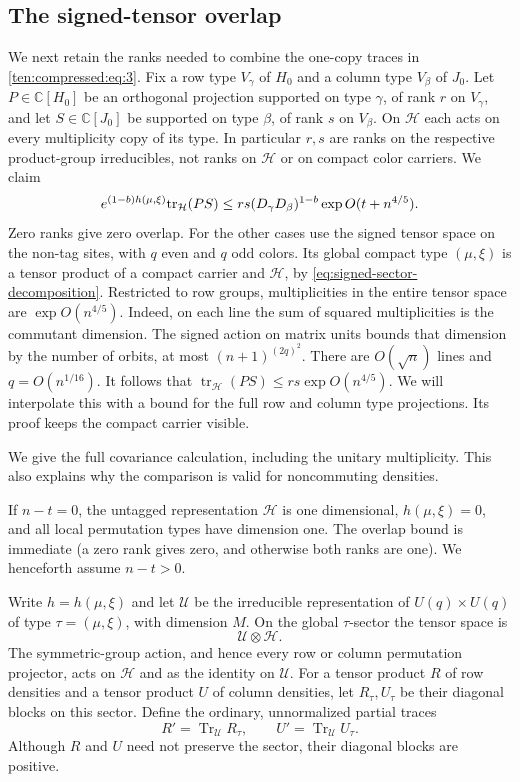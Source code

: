 \subsection{The signed-tensor overlap}
We next retain the ranks needed to combine the one-copy traces in
\eqref{ten:compressed:eq:3}. Fix a row type $V_\gamma$ of $H_0$
and a column type $V_\beta$ of $J_0$. Let $P\in\mathbb C[H_0]$
be an orthogonal projection supported on type $\gamma$, of rank
$r$ on $V_\gamma$, and let $S\in\mathbb C[J_0]$ be supported on
type $\beta$, of rank $s$ on $V_\beta$. On $\mathcal H$ each acts
on every multiplicity copy of its type. In particular $r,s$ are
ranks on the respective product-group irreducibles, not ranks on
$\mathcal H$ or on compact color carriers. We claim
\begin{equation}
 e^{(1-b)h(\mu,\xi)}{\rm tr}_{\mathcal H}(PS)
 \le r s (D_\gamma D_\beta)^{1-b}\exp O(t+n^{4/5}).
 \label{ten:compressed:eq:5}
\end{equation}
Zero ranks give zero overlap. For the other cases use the signed
tensor space on the non-tag sites, with $q$ even and $q$ odd colors.
Its global compact type $(\mu,\xi)$ is a tensor product of a
compact carrier and $\mathcal H$, by
\eqref{eq:signed-sector-decomposition}.
Restricted to row groups, multiplicities in the entire tensor
space are $\exp O(n^{4/5})$. Indeed, on each line the sum of
squared multiplicities is the commutant dimension. The signed
action on matrix units bounds that dimension by the number of
orbits, at most $(n+1)^{(2q)^2}$. There are $O(\sqrt n)$ lines
and $q=O(n^{1/16})$.
It follows that
$\operatorname{tr}_{\mathcal H}(PS)\le rs\exp O(n^{4/5})$.
We will interpolate this with a bound for the full row and column
type projections. Its proof keeps the compact carrier visible.

\label{ten:compressed:covariance-expansion}
We give the full covariance calculation, including the unitary multiplicity. This also explains why the comparison is valid for noncommuting densities.

If $n-t=0$, the untagged representation $\mathcal H$ is one dimensional, $h(\mu,\xi)=0$, and all local permutation types have dimension one. The overlap bound is immediate (a zero rank gives zero, and otherwise both ranks are one). We henceforth assume $n-t>0$.

Write $h=h(\mu,\xi)$ and let $\mathcal U$ be the irreducible representation of $U(q)\times U(q)$ of type $\tau=(\mu,\xi)$, with dimension $M$. On the global $\tau$-sector the tensor space is
\[
 \mathcal U\otimes\mathcal H.
\]
The symmetric-group action, and hence every row or column permutation projector, acts on $\mathcal H$ and as the identity on $\mathcal U$. For a tensor product $R$ of row densities and a tensor product $U$ of column densities, let $R_\tau,U_\tau$ be their diagonal blocks on this sector. Define the ordinary, unnormalized partial traces
\[
 R'=\operatorname{Tr}_{\mathcal U}R_\tau,
 \qquad U'=\operatorname{Tr}_{\mathcal U}U_\tau.
\]
Although $R$ and $U$ need not preserve the sector, their diagonal blocks are positive.

